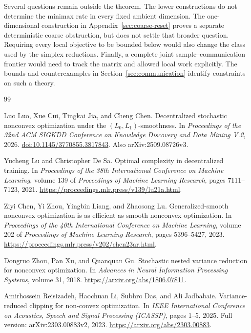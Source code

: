 \documentclass[11pt,a4paper]{article}
\theoremstyle{remark}
\begin{document}
Several questions remain outside the theorem. The lower constructions do
not determine the minimax rate in every fixed ambient dimension. The
one-dimensional construction in Appendix~\ref{sec:coarse-reset} proves a
separate deterministic coarse obstruction, but does not settle that broader
question. Requiring every local objective to be bounded below would also
change the class used by the simplex reductions. Finally, a complete joint
sample--communication frontier would need to track the matrix and allowed
local work explicitly. The bounds and counterexamples in
Section~\ref{sec:communication} identify constraints on such a theory.

\clearpage
\begin{thebibliography}{99}

Luo Luo, Xue Cui, Tingkai Jia, and Cheng Chen.
\newblock Decentralized stochastic nonconvex optimization under the
$(L_0,L_1)$-smoothness.
\newblock In \emph{Proceedings of the 32nd ACM SIGKDD Conference on Knowledge
Discovery and Data Mining V.2}, 2026.
\newblock \href{https://doi.org/10.1145/3770855.3817843}{doi:10.1145/3770855.3817843}.
\newblock Also arXiv:2509.08726v3.

Yucheng Lu and Christopher De Sa.
\newblock Optimal complexity in decentralized training.
\newblock In \emph{Proceedings of the 38th International Conference on
Machine Learning}, volume 139 of \emph{Proceedings of Machine Learning
Research}, pages 7111--7123, 2021.
\newblock \url{https://proceedings.mlr.press/v139/lu21a.html}.

Ziyi Chen, Yi Zhou, Yingbin Liang, and Zhaosong Lu.
\newblock Generalized-smooth nonconvex optimization is as efficient as smooth
nonconvex optimization.
\newblock In \emph{Proceedings of the 40th International Conference on
Machine Learning}, volume 202 of \emph{Proceedings of Machine Learning
Research}, pages 5396--5427, 2023.
\newblock \url{https://proceedings.mlr.press/v202/chen23ar.html}.

Dongruo Zhou, Pan Xu, and Quanquan Gu.
\newblock Stochastic nested variance reduction for nonconvex optimization.
\newblock In \emph{Advances in Neural Information Processing Systems},
volume 31, 2018.
\newblock \url{https://arxiv.org/abs/1806.07811}.

Amirhossein Reisizadeh, Haochuan Li, Subhro Das, and Ali Jadbabaie.
\newblock Variance-reduced clipping for non-convex optimization.
\newblock In \emph{IEEE International Conference on Acoustics, Speech and
Signal Processing (ICASSP)}, pages 1--5, 2025.
\newblock Full version: arXiv:2303.00883v2, 2023.
\newblock \url{https://arxiv.org/abs/2303.00883}.


\end{thebibliography}
\end{document}
